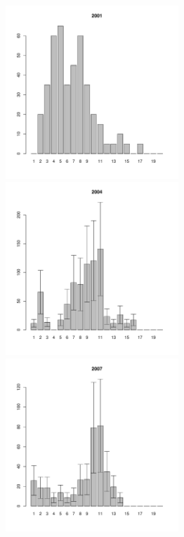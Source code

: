 \documentclass[12pt, a4paper]{article}
\begin{document}
\begin{figure}[h]

\begin{multicols}{3}
\hfill
\includegraphics[width=65mm]{../White_Sea/Luvenga_Goreliy/low_2001_.pdf}
\hfill
\includegraphics[width=65mm]{../White_Sea/Luvenga_Goreliy/low_2004_.pdf}
\hfill
\includegraphics[width=65mm]{../White_Sea/Luvenga_Goreliy/low_2007_.pdf}
\end{multicols}


\end{figure}
\end{document}

